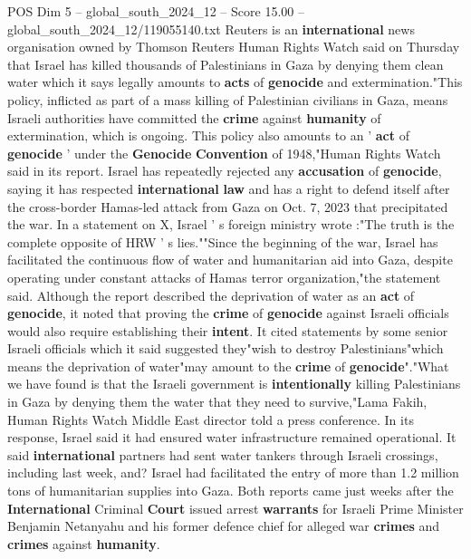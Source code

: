 \begin{textsample}{POS Dim 5 – global\_south\_2024\_12 – Score 15.00 – global\_south\_2024\_12/119055140.txt}  \label{ex:f5_pos_058}
Reuters is an \textbf{international} news organisation owned by Thomson Reuters Human Rights Watch said on Thursday that Israel has killed thousands of Palestinians in Gaza by denying them clean water which it says legally amounts to \textbf{acts} of \textbf{genocide} and extermination."This policy, inflicted as part of a mass killing of Palestinian civilians in Gaza, means Israeli authorities have committed the \textbf{crime} against \textbf{humanity} of extermination, which is ongoing.
This policy also amounts to an ' \textbf{act} of \textbf{genocide} ' under the \textbf{Genocide} \textbf{Convention} of 1948,"Human Rights Watch said in its report.
Israel has repeatedly rejected any \textbf{accusation} of \textbf{genocide}, saying it has respected \textbf{international} \textbf{law} and has a right to defend itself after the cross-border Hamas-led attack from Gaza on Oct. 7, 2023 that precipitated the war.
In a statement on X, Israel ' s foreign ministry wrote :"The truth is the complete opposite of HRW ' s lies.""Since the beginning of the war, Israel has facilitated the continuous flow of water and humanitarian aid into Gaza, despite operating under constant attacks of Hamas terror organization,"the statement said.
Although the report described the deprivation of water as an \textbf{act} of \textbf{genocide}, it noted that proving the \textbf{crime} of \textbf{genocide} against Israeli officials would also require establishing their \textbf{intent}.
It cited statements by some senior Israeli officials which it said suggested they"wish to destroy Palestinians"which means the deprivation of water"may amount to the \textbf{crime} of \textbf{genocide}"."What we have found is that the Israeli government is \textbf{intentionally} killing Palestinians in Gaza by denying them the water that they need to survive,"Lama Fakih, Human Rights Watch Middle East director told a press conference.
In its response, Israel said it had ensured water infrastructure remained operational.
It said \textbf{international} partners had sent water tankers through Israeli crossings, including last week, and?
Israel had facilitated the entry of more than 1.2 million tons of humanitarian supplies into Gaza.
Both reports came just weeks after the \textbf{International} Criminal \textbf{Court} issued arrest \textbf{warrants} for Israeli Prime Minister Benjamin Netanyahu and his former defence chief for alleged war \textbf{crimes} and \textbf{crimes} against \textbf{humanity}.

\end{textsample}

